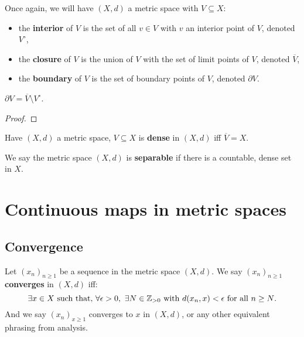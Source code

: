 \documentclass[../Year2.tex]{subfiles}
\begin{document}
\begin{definition}
    Once again, we will have $(X,d)$ a metric space with $V\subseteq X$: \begin{itemize}
        \item the \textbf{interior} of $V$ is the set of all $v\in V$ with $v$ an interior point of $V$, denoted $V^\circ$,
        \item the \textbf{closure} of $V$ is the union of $V$ with the set of limit points of $V$, denoted $\overline{V}$,
        \item the \textbf{boundary} of $V$ is the set of boundary points of $V$, denoted $\partial V$.
    \end{itemize}
\end{definition}

\begin{proposition}
    $\partial V=\overline{V}\setminus V^\circ$.
    \begin{proof}
        
    \end{proof}
\end{proposition}

\begin{definition}
    Have $(X,d)$ a metric space, $V\subseteq X$ is \textbf{dense} in $(X,d)$ iff $\overline{V}=X$.
\end{definition}

\begin{definition}
    We say the metric space $(X,d)$ is \textbf{separable} if there is a countable, dense set in $X$.
\end{definition}

\section{Continuous maps in metric spaces}

\subsection{Convergence}

\begin{definition}
    Let ${(x_n)}_{n\geq1}$ be a sequence in the metric space $(X,d)$. We say ${(x_n)}_{n\geq 1}$ \textbf{converges} in $(X,d)$ iff: \[
        \exists x\in X \ \text{\textcolor{black}{such that, }} \forall\epsilon>0, \ \exists N\in\mathbb{Z}_{>0} \ \text{\textcolor{black}{with }} d(x_n,x)<\epsilon \ \text{\textcolor{black}{for all }} n\geq N\text{\textcolor{black}{.}}
    \] And we say ${(x_n)}_{x\geq 1}$ converges to $x$ in $(X,d)$, or any other equivalent phrasing from analysis.
\end{definition}
\end{document}
